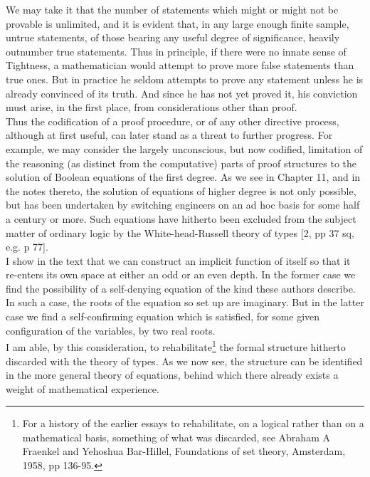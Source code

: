 \documentclass[a4paper]{article}
\theoremstyle{remark}
\begin{document}
We  may  take  it  that  the  number  of  statements  which  might  or  might  not  be  provable  is  unlimited,  and  it  is  evident  that,  in  any  large  enough  finite  sample,  untrue  statements,  of  those  bearing  any  useful   degree  of  significance,  heavily   outnumber   true   statements.  Thus   in  principle,   if   there   were  no   innate   sense  of  Tightness,  a  mathematician  would  attempt  to  prove  more  false  statements  than true  ones.  But in practice  he  seldom  attempts  to prove  any statement  unless  he  is already  convinced  of  its truth.  And  since  he has not  yet  proved  it, his  conviction  must  arise,  in  the  first  place,  from  considerations  other   than   proof. \\

Thus  the  codification  of  a  proof  procedure,  or  of  any  other  directive  process,  although  at  first  useful,  can  later  stand  as  a  threat  to  further  progress.  For  example,  we  may  consider  the  largely  unconscious, but now codified,  limitation  of the  reasoning  (as  distinct  from  the computative)  parts  of proof  structures  to  the  solution  of  Boolean  equations   of  the  first  degree.  As  we  see in  Chapter  11, and  in the  notes  thereto,  the  solution  of  equations  of  higher  degree  is  not  only  possible,  but  has  been  undertaken  by switching  engineers  on  an  ad hoc basis  for  some  half   a  century  or  more.   Such  equations   have  hitherto   been   excluded  from  the subject  matter  of ordinary  logic by the White-head-Russell  theory  of types  [2, pp  37 sq, e.g. p 77].\\

I  show  in the text  that  we can  construct  an  implicit  function  of  itself  so that  it re-enters  its own space  at  either  an odd or an even  depth.  In  the  former  case  we  find  the possibility  of  a  self-denying  equation  of  the  kind  these  authors  describe.  In  such  a  case,  the  roots  of  the  equation  so  set  up  are  imaginary.  But  in  the  latter  case  we  find  a  self-confirming  equation  which  is satisfied,  for  some  given configuration  of  the  variables,  by  two  real  roots. \\

I  am  able,  by  this  consideration,  to  rehabilitate\footnote{For a history of the earlier essays to rehabilitate, on a logical rather than on a mathematical basis, something of what was discarded, see Abraham A Fraenkel and Yehoshua Bar-Hillel, Foundations of set theory, Amsterdam, 1958, pp 136-95.}  the  formal  structure  hitherto  discarded  with  the  theory  of  types.  As  we  now  see,  the  structure  can  be  identified   in  the  more   general   theory  of  equations, behind  which  there  already  exists  a  weight  of  mathematical  experience. \\
\end{document}
